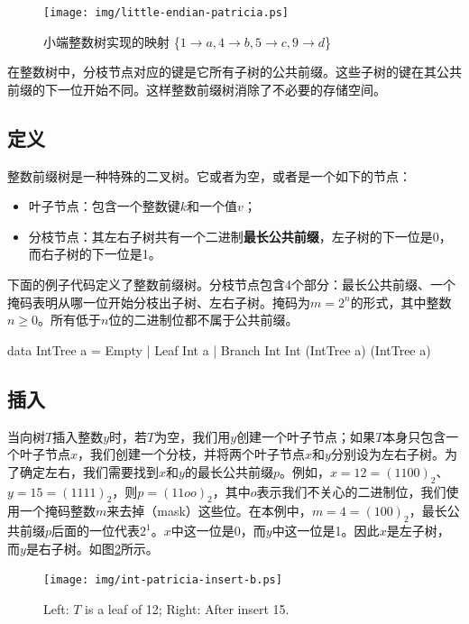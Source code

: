 \documentclass[b5paper]{ctexart}
\begin{document}
\begin{figure}[htbp]
  \centering
  \texttt{[image: img/little-endian-patricia.ps]}
  \caption{小端整数树实现的映射
     \{$ 1 \rightarrow a, 4 \rightarrow b, 5 \rightarrow c, 9 \rightarrow d$\}}
  \label{fig:little-endian-patricia}
\end{figure}

在整数树中，分枝节点对应的键是它所有子树的公共前缀。这些子树的键在其公共前缀的下一位开始不同。这样整数前缀树消除了不必要的存储空间。

\subsection{定义}

整数前缀树是一种特殊的二叉树。它或者为空，或者是一个如下的节点：

\begin{itemize}
\item 叶子节点：包含一个整数键$k$和一个值$v$；
\item 分枝节点：其左右子树共有一个二进制\textbf{最长公共前缀}，左子树的下一位是0，而右子树的下一位是1。
\end{itemize}

下面的例子代码定义了整数前缀树。分枝节点包含4个部分：最长公共前缀、一个掩码表明从哪一位开始分枝出子树、左右子树。掩码为$m = 2^n$的形式，其中整数$n \geq 0$。所有低于$n$位的二进制位都不属于公共前缀。

\begin{Haskell}
data IntTree a = Empty
               | Leaf Int a
               | Branch Int Int (IntTree a) (IntTree a)
\end{Haskell}

\subsection{插入}
当向树$T$插入整数$y$时，若$T$为空，我们用$y$创建一个叶子节点；如果$T$本身只包含一个叶子节点$x$，我们创建一个分枝，并将两个叶子节点$x$和$y$分别设为左右子树。为了确定左右，我们需要找到$x$和$y$的最长公共前缀$p$。例如，$x = 12 = (1100)_2$、$y = 15 = (1111)_2$，则$p = (11oo)_2$，其中$o$表示我们不关心的二进制位，我们使用一个掩码整数$m$来去掉（mask）这些位。在本例中，$m = 4 = (100)_2$，最长公共前缀$p$后面的一位代表$2^1$。$x$中这一位是0，而$y$中这一位是1。因此$x$是左子树，而$y$是右子树。如图\ref{fig:int-patricia-insert-b}所示。

\begin{figure}[htbp]
  \centering
  \texttt{[image: img/int-patricia-insert-b.ps]}
  \caption{Left: $T$ is a leaf of 12; Right: After insert 15.}
  \label{fig:int-patricia-insert-b}
\end{figure}
\end{document}

